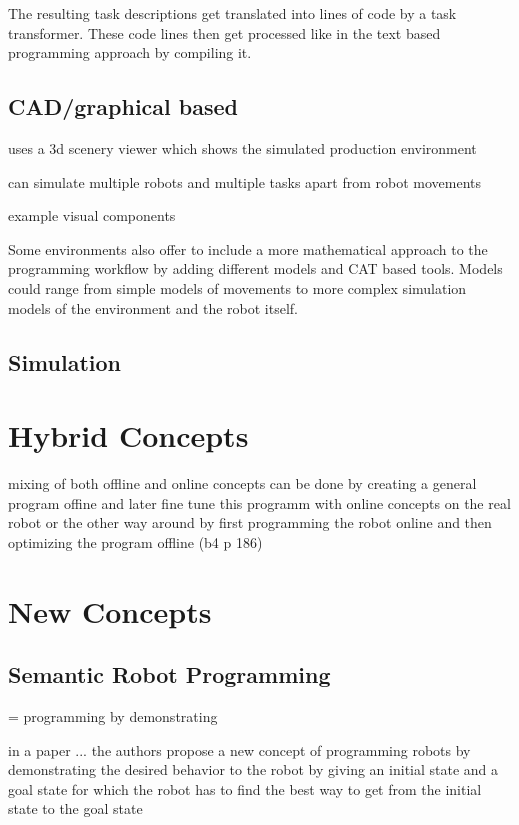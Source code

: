 \documentclass[conference]{IEEEtran}
\begin{document}
        The resulting task descriptions get translated into lines of code by a task transformer. These code lines then get processed like in the text based programming approach by compiling it. %

        

    \subsection{CAD/graphical based}

        uses a 3d scenery viewer which shows the simulated production environment

        can simulate multiple robots and multiple tasks apart from robot movements

        example visual components

        Some environments also offer to include a more mathematical approach to the programming workflow by adding different models and CAT based tools.
        Models could range from simple models of movements to more complex simulation models of the environment and the robot itself. %
        

    \subsection{Simulation}

\section{Hybrid Concepts}

    mixing of both offline and online concepts
    can be done by creating a general program offine and later  fine tune this programm with online concepts on the real robot
    or the other way around by first programming the robot online and then optimizing the program offline
    (b4 p 186)

\section{New Concepts} %

    \subsection{Semantic Robot Programming}

        = programming by demonstrating

        in a paper ... the authors propose a new concept of programming robots by demonstrating the desired behavior to the robot by giving an initial state and a goal state for which the robot has to find the best way to get from the initial state to the goal state
\end{document}
